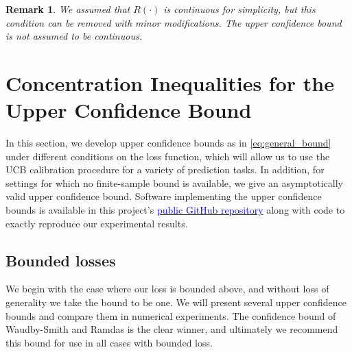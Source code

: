 \documentclass[10pt]{article}
\newtheorem{remark}{Remark}
\begin{document}
\begin{remark}
We assumed that $R(\cdot)$ is continuous for simplicity, but this condition can be removed with minor modifications. The upper confidence bound is not assumed to be continuous.
\end{remark}

\section{Concentration Inequalities for the Upper Confidence Bound}
\label{sec:concentration}
In this section, we develop upper confidence bounds as in \eqref{eq:general_bound} under different conditions on the loss function, which will allow us to use the UCB calibration procedure for a variety of prediction tasks. In addition, for settings for which no finite-sample bound is available, we give an asymptotically valid upper confidence bound. Software implementing the upper confidence bounds is available in this project's \href{https://github.com/aangelopoulos/rcps}{\textcolor{blue}{public GitHub repository}} along with code to exactly reproduce our experimental results.

\subsection{Bounded losses}
We begin with the case where our loss is bounded above, and without loss of generality we take the bound to be one. We will present several upper confidence bounds and compare them in numerical experiments. The confidence bound of Waudby-Smith and Ramdas \cite{waudby2020variance} is the clear winner, and ultimately we recommend this bound for use in all cases with bounded loss.
\end{document}
